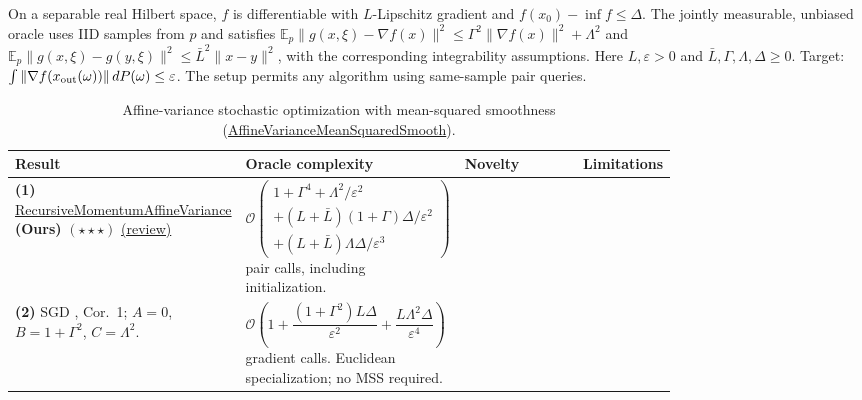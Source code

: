 \begin{table}[tp]
\centering
\caption{Affine-variance stochastic optimization with mean-squared smoothness (\href{https://github.com/k3nfalt/longtails/blob/main/LongTails/Setups/AffineVarianceMeanSquaredSmooth.lean}{AffineVarianceMeanSquaredSmooth}).}\label{tab:AffineVarianceMeanSquaredSmooth}
\parbox{\linewidth}{\footnotesize On a separable real Hilbert space, $f$ is differentiable with $L$-Lipschitz gradient and $f(x_0)-\inf f\le\Delta$. The jointly measurable, unbiased oracle uses IID samples from $p$ and satisfies $\mathbb E_p\|g(x,\xi)-\nabla f(x)\|^2\le\Gamma^2\|\nabla f(x)\|^2+\Lambda^2$ and $\mathbb E_p\|g(x,\xi)-g(y,\xi)\|^2\le\bar L^2\|x-y\|^2$, with the corresponding integrability assumptions. Here $L,\varepsilon>0$ and $\bar L,\Gamma,\Lambda,\Delta\ge0$. Target: $\int\|\nabla f(x_{\rm out}(\omega))\|\,dP(\omega)\le\varepsilon$. The setup permits any algorithm using same-sample pair queries.}\par\smallskip
\begin{threeparttable}
\footnotesize
\setlength{\tabcolsep}{4pt}\renewcommand{\arraystretch}{1.25}
\begin{tabularx}{\linewidth}{@{}>{\raggedright\arraybackslash}p{0.20\linewidth}>{\raggedright\arraybackslash}p{0.32\linewidth}>{\raggedright\arraybackslash}p{0.25\linewidth}>{\raggedright\arraybackslash}X@{}}
\toprule
\textbf{Result} & \textbf{Oracle complexity} & \textbf{Novelty} & \textbf{Limitations} \\
\midrule
\textbf{(1)} \href{https://github.com/k3nfalt/longtails/blob/main/LongTails/Theorems/RecursiveMomentumAffineVariance.lean}{Recursive\allowbreak Momentum\allowbreak Affine\allowbreak Variance} \textbf{(Ours)} $(\star\star\star)$ \href{https://github.com/k3nfalt/longtails/blob/main/scripts/reviews/RecursiveMomentumAffineVariance.md}{(review)}
& $\mathcal{O}\!\left(\begin{gathered}1+\Gamma^4+\Lambda^2/\varepsilon^2\\ +(L+\bar L)(1+\Gamma)\Delta/\varepsilon^2\\ +(L+\bar L)\Lambda\Delta/\varepsilon^3\end{gathered}\right)$ pair calls, including initialization. & & \\
\midrule[1.2pt]
\textbf{(2)} SGD \citep{avmKhaledRichtarik2020v3}, Cor.~1; $A=0$, $B=1+\Gamma^2$, $C=\Lambda^2$.
& $\mathcal{O}\!\left(1+\dfrac{(1+\Gamma^2)L\Delta}{\varepsilon^2}+\dfrac{L\Lambda^2\Delta}{\varepsilon^4}\right)$ gradient calls. Euclidean specialization; no MSS required.

\end{tabularx}
\end{threeparttable}
\end{table}
